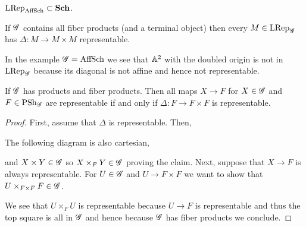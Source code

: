 \documentclass[12pt]{article}
\begin{document}
\begin{exercise}
$\mathrm{LRep}_{\mathrm{AffSch}} \subset \mathbf{Sch}$. 
\end{exercise}

\begin{thm}
If $\mathscr{G}$ contains all fiber products (and a terminal object) then every $M \in \mathrm{LRep}_{\mathscr{G}}$ has $\Delta : M \to M \times M$ representable.
\end{thm} 

\begin{rmk}
In the example $\mathscr{G} = \mathrm{AffSch}$ we see that $\mathbb{A}^2$ with the doubled origin is not in $\mathrm{LRep}_{\mathscr{G}}$ because its diagonal is not affine and hence not representable.
\end{rmk}

\begin{lemma}
If $\mathscr{G}$ has products and fiber products. Then all maps $X \to F$ for $X \in \mathscr{G}$ and $F \in \mathrm{PSh}_{\mathscr{G}}$ are representable if and only if $\Delta : F \to F \times F$ is representable.
\end{lemma}

\begin{proof}
First, assume that $\Delta$ is representable. Then,
\begin{center}
\end{center}
The following diagram is also cartesian,
\begin{center}
\end{center}
and $X \times Y \in \mathscr{G}$ so $X \times_F Y \in \mathscr{G}$ proving the claim. Next, suppose that $X \to F$ is always representable. For $U \in \mathscr{G}$ and $U \to F \times F$ we want to show that $U \times_{F \times F} F \in \mathscr{G}$. 
\begin{center}
\end{center}
We see that $U \times_F U$ is representable because $U \to F$ is representable and thus the top square is all in $\mathscr{G}$ and hence because $\mathscr{G}$ has fiber products we conclude.
\end{proof}
\end{document}

